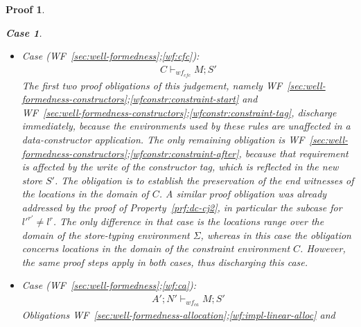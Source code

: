 \documentclass[showabstract,showacknowledgments,showpreface,showdedication,school]{iuphd}
\newtheorem*{bcase}{Case}
\theoremstyle{nonumberplain}
\newtheorem{nproof}{Proof}
\newcommand{\keywd}[1]{\mathit{#1}}
\newcommand{\skeywd}[1]{\mathit{#1}}
\newcommand{\DC}{\keywd{K}}
\newcommand{\loc}{\skeywd{l}}
\newcommand{\reg}{\skeywd{r}}
\newcommand{\ind}{\keywd{i}}
\newcommand{\indj}{\keywd{j}}
\newcommand{\STOR}{\keywd{S}}
\newcommand{\CENV}{\keywd{C}}
\newcommand{\SENV}{\keywd{\Sigma}}
\newcommand{\MENV}{\keywd{M}}
\newcommand{\AENV}{\keywd{A}}
\newcommand{\NENV}{\keywd{N}}
\newcommand{\locreg}[2]{\ensuremath{{#1}^{#2}}}
\newcommand{\storewfcfa}[3]{\ensuremath{#1 \vdash_{wf_{cfc}} #2;#3}}
\newcommand{\storewfca}[4]{\ensuremath{#1;#2 \vdash_{wf_{ca}} #3;#4}}
\newcommand{\refwellformed}[2]{WF~\ref{#1};\ref{#2}}
\newcommand{\tdatacon}{T-DataConstructor}
\begin{document}
\begin{nproof}
\begin{bcase}
\begin{itemize}
\begin{itemize}
\begin{itemize}
      By inversion on \tdatacon{}, we establish that $\locreg{\loc}{\reg} \in \NENV$.
      As such, given the well formedness of the store $\STOR$ in the premise
      of this lemma, we obtain
      from \refwellformed{sec:well-formedness-allocation}{wf:impl-write-once}
      that
      $(\reg \mapsto (\ind \mapsto \DC)) \not \in \STOR$.
      However, by the end-witness rule, for each $\indj \in [\ind_1, \ind_2)$,
      there exists a mapping from the address in the original store to its constructor tag
      $\DC_j$, which is
      $(\reg \mapsto (\indj \mapsto \DC_j)) \in \STOR$.
      Therefore, the end witness judgement remains valid in store $\STOR'$,
      thus discharging this case.
      \end{itemize}
      \item Case (\refwellformed{sec:well-formedness}{wf:cfc}):
      \begin{align*}
      \storewfcfa{\CENV}{\MENV}{\STOR'}
      \end{align*}
      The first two proof obligations of this judgement, namely \refwellformed{sec:well-formedness-constructors}{wfconstr:constraint-start} and\\ \refwellformed{sec:well-formedness-constructors}{wfconstr:constraint-tag}, discharge immediately, because the environments used by these
      rules are unaffected in a data-constructor application.
      The only remaining obligation is \refwellformed{sec:well-formedness-constructors}{wfconstr:constraint-after}, because that requirement is affected by the write of the constructor tag, which is reflected in the new store $\STOR'$.
      The obligation is to establish the preservation of the
      end witnesses of the locations in the domain of $\CENV$.
      A similar proof obligation was already addressed by the proof of Property~\ref{prf:dc-cj2},
      in particular the subcase for $\locreg{\loc'}{\reg'} \neq \locreg{\loc}{\reg}$.
      The only difference in that case is the locations range over the
      domain of the store-typing environment $\SENV$, whereas in this case
      the obligation concerns locations
      in the domain of the constraint environment $\CENV$.
      However, the same proof steps apply in both cases, thus discharging
      this case.
      \item Case (\refwellformed{sec:well-formedness}{wf:ca}):
      \begin{align*}
      \storewfca{\AENV'}{\NENV'}{\MENV}{\STOR'}
      \end{align*}
      Obligations \refwellformed{sec:well-formedness-allocation}{wf:impl-linear-alloc} and

\end{itemize}
\end{itemize}
\end{bcase}
\end{nproof}
\end{document}
